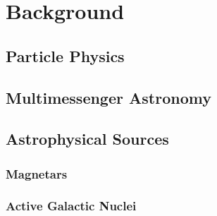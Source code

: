 \chapter{Background}
\label{ch:background}

\section{Particle Physics}
\label{sec:particle}

\section{Multimessenger Astronomy}
\label{sec:multimessenger}

\section{Astrophysical Sources}
\label{sec:sources}

\subsection{Magnetars}
\label{sub:magnetars}

\subsection{Active Galactic Nuclei}
\label{sub:agn}

